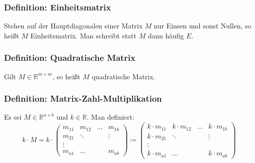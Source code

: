 \documentclass{article}
\begin{document}
  	\subsubsection{Definition: Einheitsmatrix}
  	Stehen auf der Hauptdiagonalen einer Matrix $M$ nur Einsen und sonst Nullen, so heißt $M$ Einheitsmatrix. Man schreibt statt $M$ dann häufig $E$. 
  	
  	\subsubsection{Definition: Quadratische Matrix}
  	Gilt $M \in \mathbb{R}^{m \times m}$, so heißt $M$ quadratische Matrix. 
  	
  	\subsubsection{Definition: Matrix-Zahl-Multiplikation}
  	Es sei $M \in \mathbb{R}^{a \times b}$ und $k \in \mathbb{R}$. Man definiert: 
  	\begin{equation*}
  		k \cdot M = k \cdot 
  		\begin{pmatrix}
  			m_{11}&m_{12}&\ldots&m_{1b} \\
  			m_{21}&\ddots&&\vdots \\
  			\vdots&&& \\
  			m_{a1}&\ldots&&m_{ab}
  		\end{pmatrix}
  		\coloneqq
  		\begin{pmatrix}
  			k \cdot m_{11}&k \cdot m_{12}&\ldots&k \cdot m_{1b} \\
  			k \cdot m_{21}&\ddots&&\vdots \\
  			\vdots&&& \\
  			k \cdot m_{a1}&\ldots&&k \cdot m_{ab}
  		\end{pmatrix}
  	\end{equation*}
  	
\end{document}
